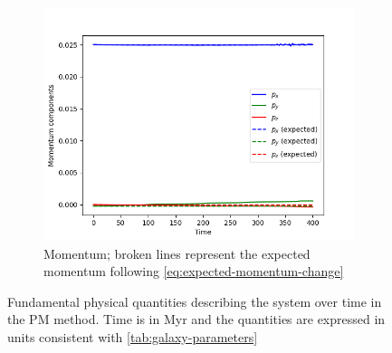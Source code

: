 \begin{figure}[H]
    \vspace{0.2cm}

    \begin{subfigure}[b]{0.5\textwidth}
        \centering
        \includegraphics[width=\textwidth]{chapters/results/img/pm-collision/momentum.png}
        \caption{Momentum; broken lines represent the expected momentum following \autoref{eq:expected-momentum-change}}
        \label{fig:physical-quantities-pm-collision-sub3}
    \end{subfigure}

    \caption{Fundamental physical quantities describing the system over time in the PM method.
        Time is in Myr and the quantities are expressed in units consistent with \autoref{tab:galaxy-parameters}}
    \label{fig:physical-quantities-pm-collision}
\end{figure}

